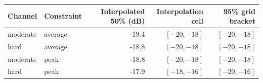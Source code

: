 \begin{tabular}{llrrr}\toprule Channel & Constraint & Interpolated 50\% (dB) & Interpolation cell & 95\% grid bracket \\\midrule
moderate & average &   -19.4 & $[-20,-18]$ & $[-20,-18]$ \\
hard & average &   -18.8 & $[-20,-18]$ & $[-20,-18]$ \\
moderate & peak &   -18.8 & $[-20,-18]$ & $[-20,-18]$ \\
hard & peak &   -17.9 & $[-18,-16]$ & $[-20,-16]$ \\
\bottomrule\end{tabular}
